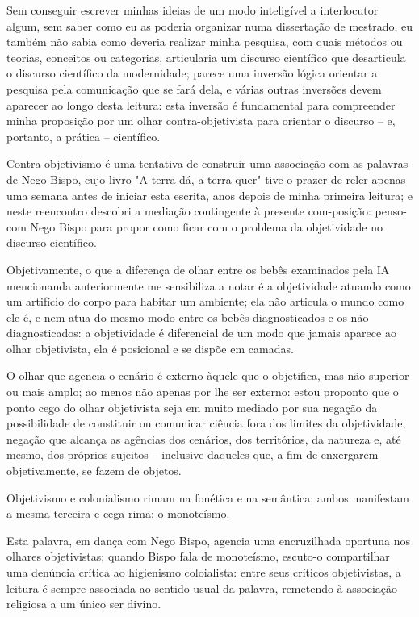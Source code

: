 Sem conseguir escrever minhas ideias de um modo inteligível a interlocutor algum, sem saber como eu as poderia organizar numa dissertação de mestrado, eu também não sabia como deveria realizar minha pesquisa, com quais métodos ou teorias, conceitos ou categorias, articularia um discurso científico que desarticula o discurso científico da modernidade;
    parece uma inversão lógica orientar a pesquisa pela comunicação que se fará dela, e várias outras inversões devem aparecer ao longo desta leitura: 
        esta inversão é fundamental para compreender minha proposição por um olhar contra-objetivista para orientar o discurso -- e, portanto, a prática -- científico.

Contra-objetivismo é uma tentativa de construir uma associação com as palavras de Nego Bispo, cujo livro "A terra dá, a terra quer" tive o prazer de reler apenas uma semana antes de iniciar esta escrita, anos depois de minha primeira leitura;
    e neste reencontro descobri a mediação contingente à presente com-posição:
        penso-com Nego Bispo para propor como ficar com o problema da objetividade no discurso científico.

Objetivamente, o que a diferença de olhar entre os bebês examinados pela IA mencionanda anteriormente me sensibiliza a notar é a objetividade atuando como um artifício do corpo para habitar um ambiente;
    ela não articula o mundo como ele é, e nem atua do mesmo modo entre os bebês diagnosticados e os não diagnosticados:
        a objetividade é diferencial de um modo que jamais aparece ao olhar objetivista, ela é posicional e se dispõe em camadas.

O olhar que agencia o cenário é externo àquele que o objetifica, mas não superior ou mais amplo;
    ao menos não apenas por lhe ser externo:
        estou proponto que o ponto cego do olhar objetivista seja em muito mediado por sua negação da possibilidade de constituir ou comunicar ciência fora dos limites da objetividade, negação que alcança as agências dos cenários, dos territórios, da natureza e, até mesmo, dos próprios sujeitos -- inclusive daqueles que, a fim de enxergarem objetivamente, se fazem de objetos.

Objetivismo e colonialismo rimam na fonética e na semântica; 
    ambos manifestam a mesma terceira e cega rima:
        o monoteísmo.

Esta palavra, em dança com Nego Bispo, agencia uma encruzilhada oportuna nos olhares objetivistas;
    quando Bispo fala de monoteísmo, escuto-o compartilhar uma denúncia crítica ao higienismo coloialista:
        entre seus críticos objetivistas, a leitura é sempre associada ao sentido usual da palavra, remetendo à associação religiosa a um único ser divino.

